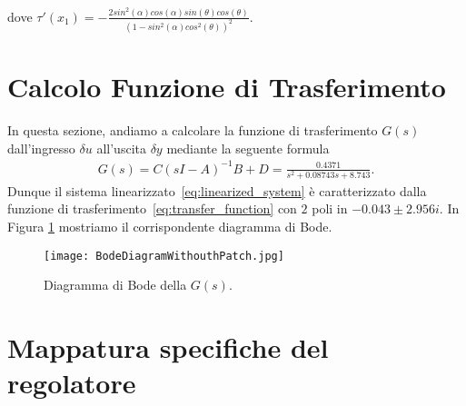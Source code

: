 \documentclass[a4paper, 11pt]{article}
\begin{document}
	dove $\tau'(x_1)= - \frac{2sin^2(\alpha)cos(\alpha)sin(\theta)cos(\theta)} 
	{(1-sin^2(\alpha)cos^2(\theta))^2}$.
	\section{Calcolo Funzione di Trasferimento}
	
	In questa sezione, andiamo a calcolare la funzione di trasferimento $G(s)$ dall'ingresso $\delta u$ all'uscita $\delta y$ mediante la seguente formula 
	\begin{align}\label{eq:transfer_function}
		G(s) = C(sI - A)^{-1}B+D = \frac{0.4371}{s^2 + 0.08743 s + 8.743}.
	\end{align}
	Dunque il sistema linearizzato~\eqref{eq:linearized_system} è caratterizzato dalla funzione di trasferimento~\eqref{eq:transfer_function} con $2$ poli in $-0.043 \pm 2.956i$. In Figura \ref{fig:G} mostriamo il corrispondente diagramma di Bode. 
	
	\begin{figure}[h]
		\centering
		\texttt{[image: BodeDiagramWithouthPatch.jpg]}
		\caption{Diagramma di Bode della $G(s)$.}
		\label{fig:G}
	\end{figure}
	
	\newcommand{\dB}{\text{dB}}
	
	\section{Mappatura specifiche del regolatore}
	\label{sec:specifications}
	
\end{document}

